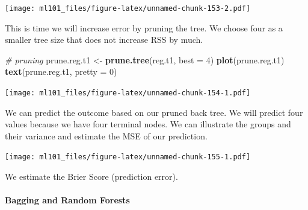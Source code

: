 \documentclass[]{article}
\newenvironment{Shaded}{\begin{snugshade}}{\end{snugshade}}
\newcommand{\CommentTok}[1]{\textcolor[rgb]{0.56,0.35,0.01}{\textit{#1}}}
\newcommand{\DataTypeTok}[1]{\textcolor[rgb]{0.13,0.29,0.53}{#1}}
\newcommand{\DecValTok}[1]{\textcolor[rgb]{0.00,0.00,0.81}{#1}}
\newcommand{\KeywordTok}[1]{\textcolor[rgb]{0.13,0.29,0.53}{\textbf{#1}}}
\newcommand{\NormalTok}[1]{#1}
\newcommand{\OperatorTok}[1]{\textcolor[rgb]{0.81,0.36,0.00}{\textbf{#1}}}
\newcommand{\StringTok}[1]{\textcolor[rgb]{0.31,0.60,0.02}{#1}}
\let\oldparagraph\paragraph
\renewcommand{\paragraph}[1]{\oldparagraph{#1}\mbox{}}
\begin{document}
\texttt{[image: ml101\_files/figure-latex/unnamed-chunk-153-2.pdf]}

This is time we will increase error by pruning the tree. We choose four as a smaller tree size that does not increase RSS by much.

\begin{Shaded}
\begin{Highlighting}[]
\CommentTok{# pruning}
\NormalTok{prune.reg.t1 <-}\StringTok{ }\KeywordTok{prune.tree}\NormalTok{(reg.t1, }\DataTypeTok{best =} \DecValTok{4}\NormalTok{)}
\KeywordTok{plot}\NormalTok{(prune.reg.t1)}
\KeywordTok{text}\NormalTok{(prune.reg.t1, }\DataTypeTok{pretty =} \DecValTok{0}\NormalTok{)}
\end{Highlighting}
\end{Shaded}

\texttt{[image: ml101\_files/figure-latex/unnamed-chunk-154-1.pdf]}

We can predict the outcome based on our pruned back tree. We will predict four values because we have four terminal nodes. We can illustrate the groups and their variance and estimate the MSE of our prediction.

\begin{Shaded}
\end{Shaded}

\texttt{[image: ml101\_files/figure-latex/unnamed-chunk-155-1.pdf]}

We estimate the Brier Score (prediction error).

\begin{Shaded}
\end{Shaded}

\hypertarget{bagging-and-random-forests}{%
\paragraph{Bagging and Random Forests}\label{bagging-and-random-forests}}
\end{document}
